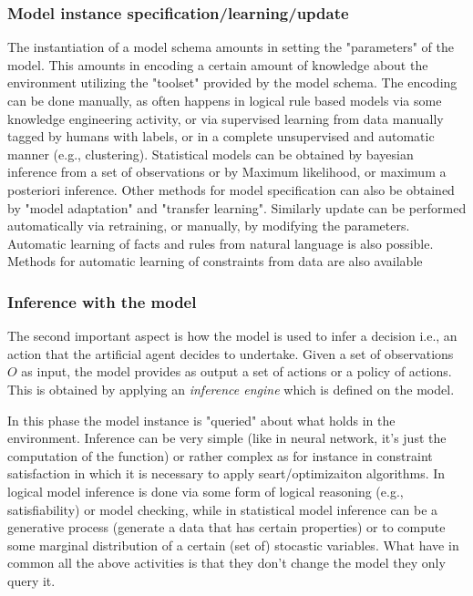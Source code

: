 \subsubsection{Model instance specification/learning/update}

The instantiation of a model schema amounts in setting the "parameters" of the model. This amounts in encoding a certain amount of knowledge about the environment utilizing the "toolset" provided by the model schema. The encoding can be done manually, as often happens in logical rule based models via some knowledge engineering activity, or via supervised learning from data manually tagged by humans with labels, or in a complete unsupervised and automatic manner (e.g., clustering). Statistical models can be obtained by bayesian inference from a set of observations or by Maximum likelihood, or maximum a posteriori inference. Other methods for model specification can also be obtained by "model adaptation" and "transfer learning". Similarly update can be performed automatically via retraining, or manually, by modifying the parameters. Automatic learning of facts and rules from natural language is also possible. Methods for automatic learning of constraints from data are also available

\subsubsection{Inference with the model}
The second important aspect is how the model is used to infer a
decision i.e., an action that the artificial agent decides to
undertake. Given a set of observations $O$ as input, the model
provides as output a set of actions or a policy of actions. This is
obtained by applying an \emph{inference engine} which is defined on
the model.

In this phase the model instance is "queried" about what holds in the
environment. Inference can be very simple (like in neural network,
it's just the computation of the function) or rather complex as for
instance in constraint satisfaction in which it is necessary to apply
seart/optimizaiton algorithms. In logical model inference is done via
some form of logical reasoning (e.g., satisfiability) or model
checking, while in statistical model inference can be a generative
process (generate a data that has certain properties) or to compute
some marginal distribution of a certain (set of) stocastic
variables. What have in common all the above activities is that they
don't change the model they only query it.

